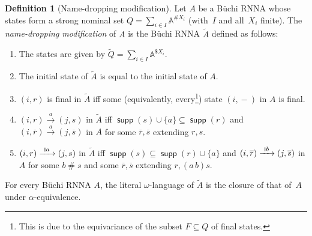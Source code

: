 \documentclass[final,a4paper,UKenglish,thm-restate,autoref,numberwithinsect]{lipics-v2021}
\newcommand{\scriptmidmid}{\hspace{0.2ex}{\rule[-0.1ex]{0.6pt}{1.1ex}}\hspace{0.2ex}}
\newcommand{\scriptnew}[1]{{\scriptmidmid}#1}
\numberwithin{equation}{section}
\newcommand{\ol}{\overline}
\newcommand{\xto}[1]{\xrightarrow{~#1~}}
\newcommand{\seq}{\subseteq}
\newcommand{\tl}{\widetilde}
\newcommand{\dash}{\mathop{-}}
\newcommand{\+}[1]{\mathcal{#1}\xspace}
\newcommand{\names}{\mathbb{A}}
\DeclareMathOperator{\supp}{\mathsf{supp}} %
\newcommand{\fresh}{\mathbin{\#}}
\theoremstyle{definition}
\newtheorem{defn}[theorem]{Definition}
\begin{document}
\begin{defn}[Name-dropping modification]\label{def:ndc}
  Let $A$ be a Büchi RNNA whose states form a strong nominal set
  $Q=\sum_{i\in I} \names^{\# X_i}$ (with~$I$ and all~$X_i$
  finite). The \emph{name-dropping modification} of $A$ is the Büchi RNNA
  $\widetilde{A}$ defined as follows:
  \begin{enumerate}
  \item The states are given by $\tl{Q} = \sum_{i\in I}\names^{\$ X_i}$.
  \item The initial state of $\tl{A}$ is equal to the initial state of $A$.
  \item $(i,r)$ is final in $\tl{A}$ iff some (equivalently,
    every\footnote{This is due to the equivariance of the subset $F
      \subseteq Q$ of final states.})
    state $(i,\dash)$ in $A$ is final.
    

  \item $(i,r)\xto{a} (j,s)$  in $\tl{A}$ iff $\supp(s)\cup \{a\}
    \seq \supp(r)$ and $(i,\ol{r})\xto{a} (j,\ol{s})$ in $A$ for some
    $\ol{r},\ol{s}$ extending $r, s$.
    
  \item $(i,r)\xto{\scriptnew a} (j,s)$ in $\tl{A}$ iff $\supp(s)\seq
    \supp(r)\cup \{a\}$ and $(i,\ol{r})\xto{\scriptnew b} (j,\ol{s})$ in $A$ for
    some $b\fresh s$ and some $\ol{r},\ol{s}$ extending $r,(a\,b)s$.
  \end{enumerate}
\end{defn}
%
\begin{theorem}\label{thm:ncd_buechi_rnna}
  For every Büchi RNNA $A$, the literal $\omega$-language
  of $\tl A$ is the closure of that of~$A$ under $\alpha$-equivalence.
\end{theorem}
%
\end{document}
